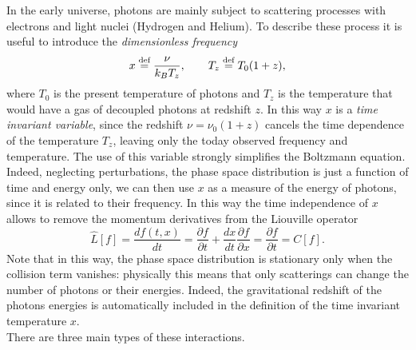 In the early universe, photons are mainly subject to scattering processes with electrons and light nuclei (Hydrogen and Helium). To describe these process it is useful to introduce the \emph{dimensionless frequency}
\begin{equation}\label{eq:dimensionless_frequency}
    x\stackrel{\text{def}}{=}\frac{\nu}{k_BT_z},\qquad T_z\stackrel{\text{def}}{=} T_0(1+z),
\end{equation}
where $T_0$ is the present temperature of photons and $T_z$ is the temperature that would have a gas of decoupled photons at redshift $z$. In this way $x$ is a \emph{time invariant variable}, since the redshift $\nu=\nu_0(1+z)$ cancels the time dependence of the temperature $T_z$, leaving only the today observed frequency and temperature. The use of this variable strongly simplifies the Boltzmann equation. Indeed, neglecting perturbations, the phase space distribution is just a function of time and energy only, we can then use $x$ as a measure of the energy of photons, since it is related to their frequency. In this way the time independence of $x$ allows to remove the momentum derivatives from the Liouville operator $$ \hat{L}[f]=\frac{df(t,x)}{dt}=\frac{\partial f}{\partial t}+\frac{dx}{dt}\frac{\partial f}{\partial x}=\frac{\partial f}{\partial t}=C[f].$$
Note that in this way, the phase space distribution is stationary only when the collision term vanishes: physically this means that only scatterings can change the number of photons or their energies. Indeed, the gravitational redshift of the photons energies is automatically included in the definition of the time invariant temperature $x$.\\
There are three main types of these interactions.
